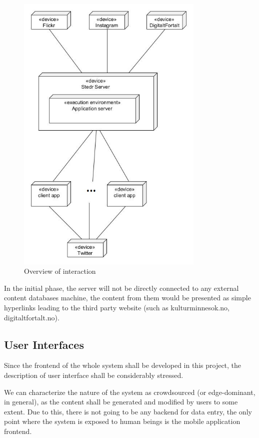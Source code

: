 \documentclass[11pt]{book}
\begin{document}
\begin{figure}[H]
      \centering
      \includegraphics[width=0.8\textwidth]{Figures/Architecture/deploymentView.jpg}
      \caption{Overview of interaction}
      \label{fig:req_overview}
\end{figure}

In the initial phase, the server will not be directly connected to any external content databases machine, the content from them would be presented as simple hyperlinks leading to the third party website (such as kulturminnesok.no, digitaltfortalt.no).

\subsection{User Interfaces}
Since the frontend of the whole system shall be developed in this project, the description of user interface shall be considerably stressed.

We can characterize the nature of the system as crowdsourced (or edge-dominant, in general), as the content shall be generated and modified by users to some extent. Due to this, there is not going to be any backend for data entry, the only point where the system is exposed to human beings is the mobile application frontend.
\end{document}
